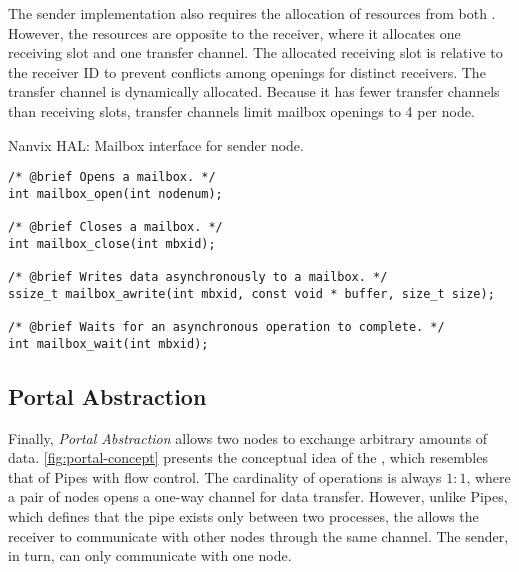 
				The sender implementation also requires the allocation of resources
				from both \nocs. However, the resources are opposite to the receiver,
				where it allocates one \cnoc receiving slot and one \dnoc transfer channel.
				The allocated \cnoc receiving slot is relative to the receiver ID to
				prevent conflicts among openings for distinct receivers. The transfer
				channel is dynamically allocated. Because it has fewer transfer channels
				than receiving slots, transfer channels limit mailbox openings to 4 per node.

\begin{listing}[!tb]
\caption{Nanvix HAL: Mailbox interface for sender node.}
\label{code:hal-mailbox-sender}
\begin{verbatim}
/* @brief Opens a mailbox. */
int mailbox_open(int nodenum);

/* @brief Closes a mailbox. */
int mailbox_close(int mbxid);

/* @brief Writes data asynchronously to a mailbox. */
ssize_t mailbox_awrite(int mbxid, const void * buffer, size_t size);

/* @brief Waits for an asynchronous operation to complete. */
int mailbox_wait(int mbxid);
\end{verbatim}
\end{listing}

		\subsection{Portal Abstraction}
		\label{sec.portal-abs}

			Finally, \textit{Portal Abstraction} allows two nodes to exchange arbitrary
			amounts of data. \autoref{fig:portal-concept} presents the conceptual idea
			of the \portal, which resembles that of \posix Pipes with flow control.
			The cardinality of operations is always $1:1$, where a pair of nodes opens
			a one-way channel for data transfer. However, unlike \posix Pipes, which
			defines that the pipe exists only between two processes, the \portal allows
			the receiver to communicate with other nodes through the same channel.
			The sender, in turn, can only communicate with one node.

